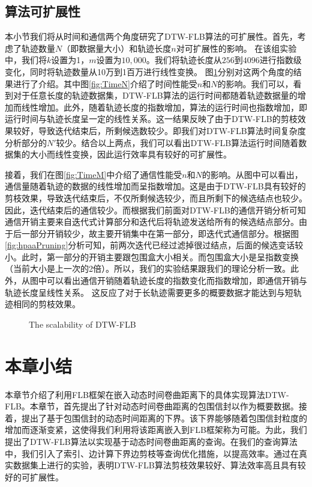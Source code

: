  \subsection{算法可扩展性}

  本小节我们将从时间和通信两个角度研究了DTW-FLB算法的可扩展性。首先，考虑了轨迹数量$N$（即数据量大小）和轨迹长度$n$对可扩展性的影响。
  在该组实验中，我们将$k$设置为1，$m$设置为$10,000$。我们将轨迹长度从$256$到$4096$进行指数级变化，同时将轨迹数量从10万到1百万进行线性变换。
  图\ref{fig:HpaaScalability}分别对这两个角度的结果进行了介绍。其中图\ref{fig:TimeN}介绍了时间性能受$n$和$N$的影响。我们可以，看到对于任意长度的轨迹数据集，DTW-FLB算法的运行时间都随着轨迹数据量的增加而线性增加。此外，随着轨迹长度的指数增加，算法的运行时间也指数增加，即运行时间与轨迹长度呈一定的线性关系。这一结果反映了由于DTW-FLB的剪枝效果较好，导致迭代结束后，所剩候选数较少。即我们对DTW-FLB算法时间复杂度分析部分的$N'$较少。结合以上两点，我们可以看出DTW-FLB算法运行时间随着数据集的大小而线性变换，因此运行效率具有较好的可扩展性。
  
  接着，我们在图\ref{fig:TimeM}中介绍了通信性能受$n$和$N$的影响。从图中可以看出，通信量随着轨迹的数据的线性增加而呈指数增加。这是由于DTW-FLB具有较好的剪枝效果，导致迭代结束后，不仅所剩候选较少，而且所剩下的候选结点也较少。因此，迭代结束后的通信较少。而根据我们前面对DTW-FLB的通信开销分析可知通信开销主要来自迭代式计算部分和迭代后将轨迹发送给所有的候选结点部分。由于后一部分开销较少，故主要开销集中在第一部分，即迭代式通信部分。根据图\ref{fig:hpaaPruning}分析可知，前两次迭代已经过滤掉很过结点，后面的候选变话较小。此时，第一部分的开销主要跟包围盒大小相关。而包围盒大小是呈指数变换（当前大小是上一次的2倍）。所以，我们的实验结果跟我们的理论分析一致。此外，从图中可以看出通信开销随着轨迹长度的指数变化而指数增加，即通信开销与轨迹长度呈线性关系。
   这反应了对于长轨迹需要更多的概要数据才能达到与短轨迹相同的剪枝效果。

   \begin{figure} [t]
   	\centering
   	\caption{The scalability  of DTW-FLB}
   	\label{fig:HpaaScalability}
   \end{figure}
   
  
  \section{本章小结}\label{sec-c5-conclusion}
本章节介绍了利用FLB框架在嵌入动态时间卷曲距离下的具体实现算法DTW-FLB。本章节，首先提出了针对动态时间卷曲距离的包围信封以作为概要数据。接着，提出了基于包围信封的动态时间距离的下界。该下界能够随着包围信封粒度的增加而逐渐变紧，这使得我们利用将该距离嵌入到FLB框架称为可能。为此，我们提出了DTW-FLB算法以实现基于动态时间卷曲距离的查询。在我们的查询算法中，我们引入了索引、边计算下界边剪枝等查询优化措施，以提高效率。通过在真实数据集上进行的实验，表明DTW-FLB算法剪枝效果较好、算法效率高且具有较好的可扩展性。


